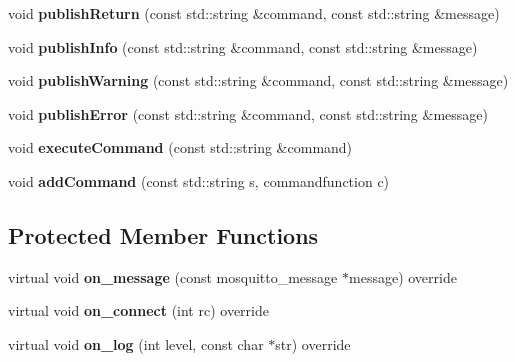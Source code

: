 \begin{DoxyCompactItemize}
\item 
void {\bfseries publish\+Return} (const std\+::string \&command, const std\+::string \&message)\hypertarget{class_command_processor_ae97c2e58deecce8bd6dac0d081d73f03}{}\label{class_command_processor_ae97c2e58deecce8bd6dac0d081d73f03}

\item 
void {\bfseries publish\+Info} (const std\+::string \&command, const std\+::string \&message)\hypertarget{class_command_processor_a0f5c17ab23203abee8a48c82f3338a28}{}\label{class_command_processor_a0f5c17ab23203abee8a48c82f3338a28}

\item 
void {\bfseries publish\+Warning} (const std\+::string \&command, const std\+::string \&message)\hypertarget{class_command_processor_a0691a985030ebb0cef833aa779bedeab}{}\label{class_command_processor_a0691a985030ebb0cef833aa779bedeab}

\item 
void {\bfseries publish\+Error} (const std\+::string \&command, const std\+::string \&message)\hypertarget{class_command_processor_a81e3fda8d03c8f5aea99a442ebdb0050}{}\label{class_command_processor_a81e3fda8d03c8f5aea99a442ebdb0050}

\item 
void {\bfseries execute\+Command} (const std\+::string \&command)\hypertarget{class_command_processor_a3a830f1939e458f31f0cd2d42855609f}{}\label{class_command_processor_a3a830f1939e458f31f0cd2d42855609f}

\item 
void {\bfseries add\+Command} (const std\+::string s, commandfunction c)\hypertarget{class_command_processor_a67598e9086a7c3a7228c078acb7f4eab}{}\label{class_command_processor_a67598e9086a7c3a7228c078acb7f4eab}

\end{DoxyCompactItemize}
\subsection*{Protected Member Functions}
\begin{DoxyCompactItemize}
\item 
virtual void {\bfseries on\+\_\+message} (const mosquitto\+\_\+message $\ast$message) override\hypertarget{class_command_processor_ab1a2cf5d74c8bbd9bbcf57c7a4b14c66}{}\label{class_command_processor_ab1a2cf5d74c8bbd9bbcf57c7a4b14c66}

\item 
virtual void {\bfseries on\+\_\+connect} (int rc) override\hypertarget{class_command_processor_a242db95796f5dd1b17a139ed19d6ecfa}{}\label{class_command_processor_a242db95796f5dd1b17a139ed19d6ecfa}

\item 
virtual void {\bfseries on\+\_\+log} (int level, const char $\ast$str) override\hypertarget{class_command_processor_a7300ca2e9cd0237f17ce82f64123e553}{}\label{class_command_processor_a7300ca2e9cd0237f17ce82f64123e553}

\end{DoxyCompactItemize}
